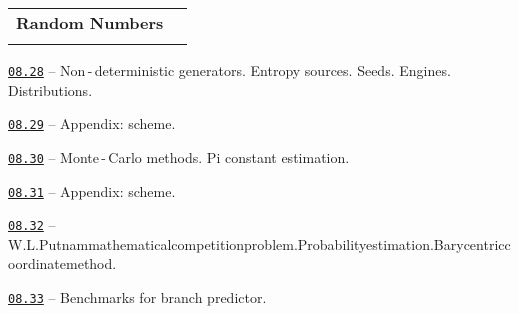 \documentclass[a4paper,12pt]{article}
\renewenvironment{itemize}
{
    \begin{list}{\labelitemi}
    {
      \setlength{\topsep}{0pt}
      \setlength{\partopsep}{0pt}
      \setlength{\parskip}{0pt}
      \setlength{\itemsep}{0pt}
      \setlength{\parsep}{0pt}
      \setlength{\leftmargin}{14.5pt}
    }
}{\end{list}}
\begin{document}
\bigskip\medskip

\begin{tabular}{!{\vrule width 1pt}L{3.6cm}!{\vrule width 1pt}L{15.4cm}!{\vrule width 0pt}} 


\textbf{Random Numbers} & \\


\end{tabular}

\medskip\smallskip

\begin{itemize}

    \item \href{https://github.com/i-s-m-mipt/Education/blob/master/projects/examples/source/08.28.cpp}{\texttt{08.28}} -- Non\,-\,deterministic generators. Entropy sources. Seeds. Engines. Distributions.

    \smallskip

    \item \href{https://github.com/i-s-m-mipt/Education/blob/master/projects/examples/source/08.29.pdf}{\texttt{08.29}} -- Appendix: scheme.

    \smallskip

    \item \href{https://github.com/i-s-m-mipt/Education/blob/master/projects/examples/source/08.30.cpp}{\texttt{08.30}} -- Monte\,-\,Carlo methods. Pi constant estimation.

    \smallskip

    \item \href{https://github.com/i-s-m-mipt/Education/blob/master/projects/examples/source/08.31.pdf}{\texttt{08.31}} -- Appendix: scheme.

    \smallskip

    \item \href{https://github.com/i-s-m-mipt/Education/blob/master/projects/examples/source/08.32.cpp}{\texttt{08.32}} -- W.\:L.\:Putnam\:mathematical\:competition\:problem.\:Probability\:estimation.\:Barycentric\:coordinate\:method.

    \smallskip

    \item \href{https://github.com/i-s-m-mipt/Education/blob/master/projects/examples/source/08.33.cpp}{\texttt{08.33}} -- Benchmarks for branch predictor.

\end{itemize}
\end{document}
